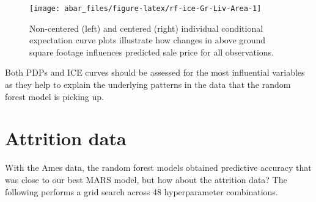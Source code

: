 \documentclass[]{book}
\theoremstyle{definition}
\theoremstyle{definition}
\theoremstyle{definition}
\theoremstyle{remark}
\begin{document}
\begin{figure}

{\centering \texttt{[image: abar\_files/figure-latex/rf-ice-Gr-Liv-Area-1]} 

}

\caption{Non-centered (left) and centered (right) individual conditional expectation curve plots illustrate how changes in above ground square footage influences predicted sale price for all observations.}\label{fig:rf-ice-Gr-Liv-Area}
\end{figure}

Both PDPs and ICE curves should be assessed for the most influential
variables as they help to explain the underlying patterns in the data
that the random forest model is picking up.

\hypertarget{attrition-data-2}{%
\section{Attrition data}\label{attrition-data-2}}

With the Ames data, the random forest models obtained predictive
accuracy that was close to our best MARS model, but how about the
attrition data? The following performs a grid search across 48
hyperparameter combinations.
\end{document}
